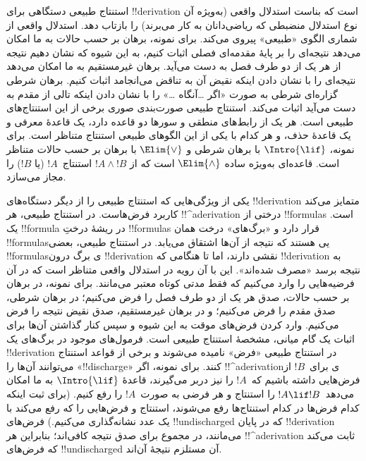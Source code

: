 \documentclass[../../../include/open-logic-section]{subfiles}
\begin{document}
      {}
      {}


استنتاج طبیعی دستگاهی برای !!{derivation} است که بناست استدلال واقعی
(به‌ویژه آن نوع استدلال منضبطی که ریاضی‌دانان به کار می‌برند) را بازتاب دهد.
استدلال واقعی از شماری الگوی «طبیعی» پیروی می‌کند. برای نمونه، برهان بر حسب
حالات به ما امکان می‌دهد نتیجه‌ای را بر پایهٔ مقدمه‌ای فصلی اثبات کنیم، به این
شیوه که نشان دهیم نتیجه از هر یک از دو طرف فصل به دست می‌آید. برهان غیرمستقیم
به ما امکان می‌دهد نتیجه‌ای را با نشان دادن اینکه نقیض آن به تناقض می‌انجامد
اثبات کنیم. برهان شرطی گزاره‌ای شرطی به صورت «اگر \dots آنگاه \dots» را با
نشان دادن اینکه تالی از مقدم به دست می‌آید اثبات می‌کند. استنتاج طبیعی
صورت‌بندی صوری برخی از این استنتاج‌های طبیعی است. هر یک از رابط‌های منطقی و
سورها دو قاعده دارد، یک قاعدهٔ معرفی و یک قاعدهٔ حذف، و هر کدام با یکی از
این الگوهای طبیعی استنتاج متناظر است. برای نمونه، $\Intro{\lif}$ با برهان شرطی
و $\Elim{\lor}$ با برهان بر حسب حالات متناظر است. قاعده‌ای به‌ویژه ساده
$\Elim{\land}$ است که از $!A \land !B$ استنتاج~$!A$ (یا $!B$) را مجاز می‌سازد.

یکی از ویژگی‌هایی که استنتاج طبیعی را از دیگر دستگاه‌های !!{derivation} متمایز
می‌کند کاربرد فرض‌هاست. در استنتاج طبیعی، هر !!^a{derivation} درختی از
!!{formula}s است. یک !!{formula} در ریشهٔ درختِ !!{formula}s قرار دارد و
«برگ‌های» درخت همان !!{formula}sیی هستند که نتیجه از آن‌ها اشتقاق می‌یابد.
در استنتاج طبیعی، بعضی !!{formula}sی برگ درون !!{derivation} نقشی دارند، اما
تا هنگامی که !!{derivation} به نتیجه برسد «مصرف شده‌اند». این با آن رویه در
استدلال واقعی متناظر است که در آن فرضیه‌هایی را وارد می‌کنیم که فقط مدتی کوتاه
معتبر می‌مانند. برای نمونه، در برهان بر حسب حالات، صدق هر یک از دو طرف فصل را
فرض می‌کنیم؛ در برهان شرطی، صدق مقدم را فرض می‌کنیم؛ و در برهان غیرمستقیم،
صدق نقیض نتیجه را فرض می‌کنیم. وارد کردن فرض‌های موقت به این شیوه و سپس کنار
گذاشتن آن‌ها برای اثبات یک گام میانی، مشخصهٔ استنتاج طبیعی است. فرمول‌های
موجود در برگ‌های یک !!{derivation} در استنتاج طبیعی «فرض» نامیده می‌شوند و برخی
از قواعد استنتاج می‌توانند آن‌ها را «!!{discharge}» کنند. برای نمونه، اگر
!!^a{derivation}ی برای~$!B$ از فرض‌هایی داشته باشیم که~$!A$ را نیز دربر می‌گیرند،
قاعدهٔ $\Intro{\lif}$ به ما امکان می‌دهد~$!A \lif !B$ را استنتاج و هر فرضی به
صورت~$!A$ را رفع کنیم. (برای ثبت اینکه کدام فرض‌ها در کدام استنتاج‌ها رفع
می‌شوند، استنتاج و فرض‌هایی را که رفع می‌کند با یک عدد نشانه‌گذاری می‌کنیم.)
فرض‌های !!{undischarged} که در پایان !!{derivation} می‌مانند، در مجموع
برای صدق نتیجه کافی‌اند؛ بنابراین هر !!^a{derivation} ثابت می‌کند که فرض‌های
!!{undischarged} آن مستلزم نتیجهٔ آن‌اند.
\end{document}
